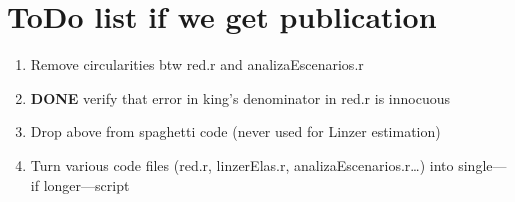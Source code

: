 \documentclass{article}
\begin{document}
\section{ToDo list if we get publication}
\label{sec:orgheadline47}
\begin{enumerate}
\item Remove circularities btw red.r and analizaEscenarios.r
\label{sec:orgheadline43}
\item {\bfseries\sffamily DONE} verify that error in king's denominator in red.r is innocuous
\label{sec:orgheadline44}
\item Drop above from spaghetti code (never used for Linzer estimation)
\label{sec:orgheadline45}

\item Turn various code files (red.r, linzerElas.r, analizaEscenarios.r\ldots{}) into single---if longer---script
\label{sec:orgheadline46}
\end{enumerate}
\end{document}
